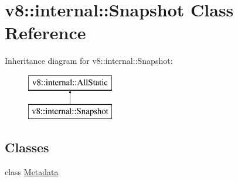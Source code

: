 \hypertarget{classv8_1_1internal_1_1_snapshot}{}\section{v8\+:\+:internal\+:\+:Snapshot Class Reference}
\label{classv8_1_1internal_1_1_snapshot}
Inheritance diagram for v8\+:\+:internal\+:\+:Snapshot\+:\begin{figure}[H]
\begin{center}
\leavevmode
\includegraphics[height=2.000000cm]{classv8_1_1internal_1_1_snapshot}
\end{center}
\end{figure}
\subsection*{Classes}
\begin{DoxyCompactItemize}
\item 
class \hyperlink{classv8_1_1internal_1_1_snapshot_1_1_metadata}{Metadata}
\end{DoxyCompactItemize}
